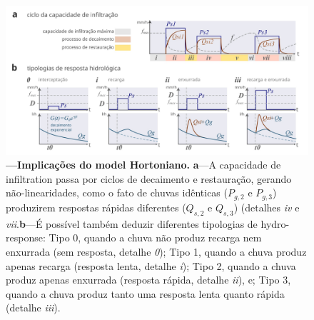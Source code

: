 \documentclass[./main.tex]{subfiles}
\begin{document}
\begin{figure}[t!] 
\centering				
\includegraphics[width=0.98\linewidth]{figs/fig_horton2.jpg}		
\caption[Implicações do \gls{model} Hortoniano]
{\textbf{---\;Implicações do \gls{model} Hortoniano.}
    \textbf{a}\;---\;A capacidade de \gls{infiltration} passa por ciclos de decaimento e restauração, gerando não-linearidades, como o fato de chuvas idênticas ($P_{g,2}$ e $P_{g,3}$) produzirem respostas rápidas diferentes ($Q_{s,2}$ e $Q_{s,3}$) (detalhes \textrm{\textit{iv}} e \textrm{\textit{vii}}.\;\textbf{b}\;---\;É possível também deduzir diferentes tipologias de \gls{hydro-response}: Tipo 0, quando a chuva não produz recarga nem enxurrada (sem resposta, detalhe \textrm{\textit{0}}); Tipo 1, quando a chuva produz apenas recarga (resposta lenta, detalhe \textrm{\textit{i}}); Tipo 2, quando a chuva produz apenas enxurrada (resposta rápida, detalhe \textrm{\textit{ii}}), e; Tipo 3, quando a chuva produz tanto uma resposta lenta quanto rápida (detalhe \textrm{\textit{iii}}).
}
\label{fig:hydro:horton2} 		
\end{figure}
\end{document}
